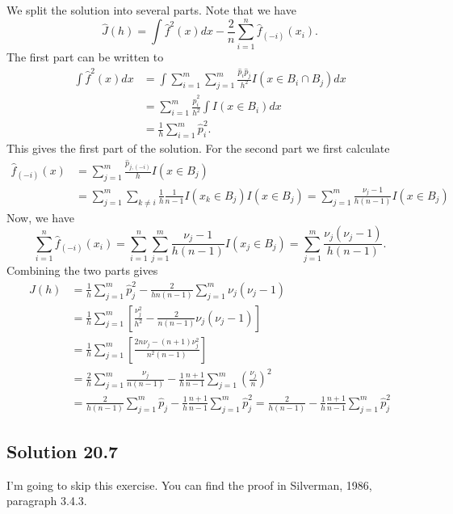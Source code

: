 We split the solution into several parts.
Note that we have
\begin{equation*}
    \hat{J}(h) = \int \hat{f}^2(x) dx - \frac{2}{n} \sum_{i = 1}^n \hat{f}_{(-i)}(x_i).
\end{equation*}
The first part can be written to
\begin{equation*}
    \begin{split}
        \int \hat{f}^2(x) dx
            &= \int \sum_{i = 1}^m \sum_{j = 1}^m \frac{\hat{p}_i \hat{p}_j}{h^2} I(x \in B_i \cap B_j) dx \\
            &= \sum_{i = 1}^m \frac{\hat{p}_i^2}{h^2} \int I(x \in B_i) dx \\
            &= \frac{1}{h} \sum_{i = 1}^m \hat{p}_i^2.
    \end{split}
\end{equation*}
This gives the first part of the solution.
For the second part we first calculate
\begin{equation*}
    \begin{split}
        \hat{f}_{(-i)}(x)
            &= \sum_{j = 1}^m \frac{\hat{p}_{j,(-i)}}{h} I(x \in B_j) \\
            &= \sum_{j = 1}^m \sum_{k \neq i} \frac{1}{h} \frac{1}{n - 1} I(x_k \in B_j) I(x \in B_j)
            = \sum_{j = 1}^m \frac{\nu_j - 1}{h(n - 1)} I(x \in B_j)
    \end{split}
\end{equation*}
Now, we have
\begin{equation*}
        \sum_{i = 1}^n \hat{f}_{(-i)}(x_i)
            = \sum_{i = 1}^n \sum_{j = 1}^m \frac{\nu_j - 1}{h(n - 1)} I(x_j \in B_j)
            = \sum_{j = 1}^m \frac{\nu_j (\nu_j - 1)}{h (n - 1)}.
\end{equation*}
Combining the two parts gives
\begin{equation*}
    \begin{split}
        \hat{J}(h) &= \frac{1}{h} \sum_{j = 1}^m \hat{p}_j^2 - \frac{2}{h n (n - 1)} \sum_{j = 1}^m \nu_j(\nu_j - 1) \\
            &= \frac{1}{h} \sum_{j = 1}^m \left[\frac{\nu_j^2}{h^2} - \frac{2}{n(n-1)} \nu_j(\nu_j - 1)\right] \\
            &= \frac{1}{h} \sum_{j = 1}^m \left[\frac{2 n \nu_j - (n + 1) \nu_j^2}{n^2 (n - 1)}\right] \\
            &= \frac{2}{h} \sum_{j = 1}^m \frac{\nu_j}{n(n-1)} - \frac{1}{h} \frac{n + 1}{n - 1} \sum_{j = 1}^m \left(\frac{\nu_j}{n}\right)^2 \\
            &= \frac{2}{h(n - 1)} \sum_{j = 1}^m \hat{p}_j - \frac{1}{h} \frac{n + 1}{n - 1} \sum_{j = 1}^m \hat{p}_j^2
            = \frac{2}{h(n - 1)} - \frac{1}{h} \frac{n + 1}{n - 1} \sum_{j = 1}^m \hat{p}_j^2
    \end{split}
\end{equation*}


\subsection*{Solution 20.7}

I'm going to skip this exercise.
You can find the proof in Silverman, 1986, paragraph 3.4.3.
